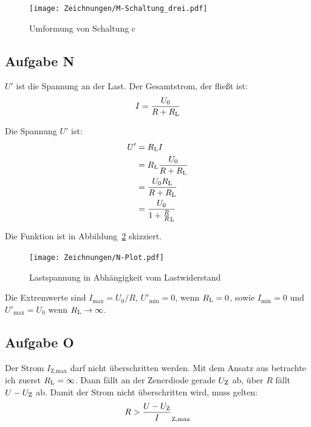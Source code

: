 \begin{figure}[htbp]
	\centering
	\caption{%
		Umformung von Schaltung c
	}
	\label{fig:M-Schaltung_drei}
	\texttt{[image: Zeichnungen/M-Schaltung\_drei.pdf]}
\end{figure}

\FloatBarrier
\subsection{Aufgabe N}

$U'$ ist die Spannung an der Last. Der Gesamtstrom, der fließt ist:
\[
	I = \frac{U_0}{R + R_\text L}
\]

\newcommand\RL{R_\text L}

Die Spannung $U'$ ist:
\begin{align*}
	U'
	&= \RL I \\
	&= \RL \frac{U_0}{R + R_\text L} \\
	&= \frac{U_0 \RL}{R + \RL} \\
	&= \frac{U_0}{1 + \frac R\RL}
\end{align*}

Die Funktion ist in Abbildung~\ref{fig:N-Plot} skizziert.

\begin{figure}[htbp]
	\centering
	\caption{%
		Lastspannung in Abhängigkeit vom Lastwiderstand
	}
	\label{fig:N-Plot}
	\texttt{[image: Zeichnungen/N-Plot.pdf]}
\end{figure}

Die Extremwerte sind $I_\text{max} = U_0/R$, $U'_\text{min} = 0$, wenn $\RL =
0$, sowie $I_\text{min} = 0$ und $U'_\text{max} = U_0$ wenn $\RL \to \infty$.

\FloatBarrier
\subsection{Aufgabe O}

\newcommand\IZmax{I_\text{Z,max}}
\newcommand\IZmin{I_\text{Z,min}}
\newcommand\IZ{I_\text Z}
\newcommand\UZ{U_\text Z}

Der Strom $\IZmax$ darf nicht überschritten werden. Mit dem Ansatz aus 
\cite[§15.1.3]{beuth/elementare_elektronik} betrachte ich zuerst $\RL =
\infty$. Dann fällt an der Zenerdiode gerade $\UZ$ ab, über $R$ fällt $U - \UZ$
ab. Damit der Strom nicht überschritten wird, muss gelten:
\[
	R > \frac{U - \UZ}\IZmax
\]


